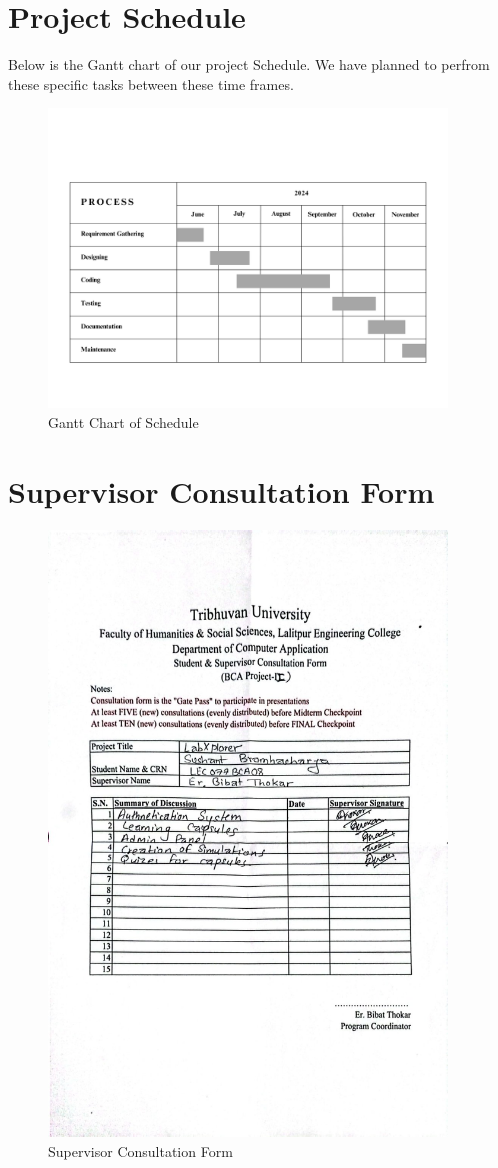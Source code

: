 \section{Project Schedule}
Below is the Gantt chart of our project Schedule. We have planned to perfrom these specific tasks between these time frames.
\begin{figure}[H]
    \centering
        \includegraphics[width=400px]{Diagrams/Gantt_Chart.png}
    \caption{Gantt Chart of Schedule}
\end{figure}
\section{Supervisor Consultation Form}
\begin{figure}[H]
    \centering
        \includegraphics[width=400px]{Diagrams/supervisor.jpg}
    \caption{Supervisor Consultation Form}
\end{figure}
